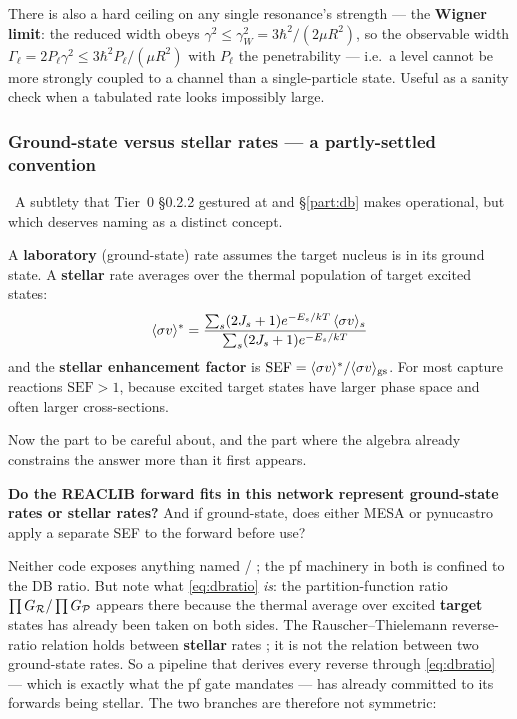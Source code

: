 There is also a hard ceiling on any single resonance's strength --- the
\textbf{Wigner limit}: the reduced width obeys
$\gamma^2 \le \gamma_W^2 = 3\hbar^2/(2\mu R^2)$, so the observable width
$\Gamma_\ell = 2P_\ell\gamma^2 \le 3\hbar^2 P_\ell/(\mu R^2)$ with $P_\ell$ the
penetrability \citep{teichmann1952,descouvemont2010} --- i.e.\ a level cannot be
more strongly coupled to a channel than a single-particle state. Useful as a
sanity check when a tabulated rate looks impossibly large.

\subsubsection{Ground-state versus stellar rates --- a partly-settled convention}
\label{sec:sef}

\begin{warn}
\warnglyph{}~A subtlety that Tier~0 \S0.2.2 gestured at and \S\ref{part:db}
makes operational, but which deserves naming as a distinct concept.
\end{warn}

A \textbf{laboratory} (ground-state) rate assumes the target nucleus is in its
ground state. A \textbf{stellar} rate averages over the thermal population of
target excited states:
%
\begin{equation*}
\langle\sigma v\rangle^{*}
= \frac{\sum_s (2J_s+1)e^{-E_s/kT}\,\langle\sigma v\rangle_s}
       {\sum_s (2J_s+1)e^{-E_s/kT}}
\end{equation*}
%
and the \textbf{stellar enhancement factor} is
$\mathrm{SEF} = \langle\sigma v\rangle^*/\langle\sigma v\rangle_{\rm gs}$. For most capture reactions
$\mathrm{SEF} > 1$, because excited target states have larger phase space and
often larger cross-sections.

Now the part to be careful about, and the part where the algebra already
constrains the answer more than it first appears.

\begin{exercise}
\textbf{Do the REACLIB forward fits in this network represent ground-state rates
or stellar rates?} And if ground-state, does either MESA or pynucastro apply a
separate SEF to the forward before use?
\end{exercise}

Neither code exposes anything named  / ; the
pf machinery in both is confined to the DB ratio. But note what
\eqref{eq:dbratio} \emph{is}: the partition-function ratio
$\prod G_{\mathcal{R}}/\prod G_{\mathcal{P}}$ appears there because the thermal average over
excited \textbf{target} states has already been taken on both sides. The
Rauscher--Thielemann reverse-ratio relation holds between \textbf{stellar} rates
\citep{rauscher2000}; it is not the relation between two ground-state rates. So
a pipeline that derives every reverse through \eqref{eq:dbratio} --- which is
exactly what the pf gate mandates --- has already committed to its forwards
being stellar. The two branches are therefore not symmetric:

